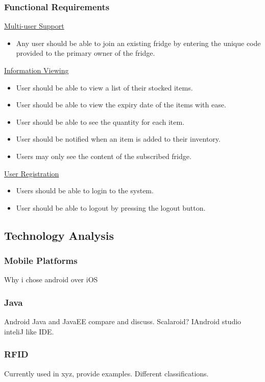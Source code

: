\documentclass[a4paper, 11pt]{article}
\begin{document}
\subsubsection{Functional Requirements}
\underline{Multi-user Support}
\begin{itemize}
  \item Any user should be able to join an existing fridge by entering the unique code provided to the primary owner of the fridge.
\end{itemize}
\underline{Information Viewing}
\begin{itemize}
  \item User should be able to view a list of their stocked items.
  \item User should be able to view the expiry date of the items with ease. 
  \item User should be able to see the quantity for each item.
  \item User should be notified when an item is added to their inventory.
  \item Users may only see the content of the subscribed fridge.
\end{itemize}
\underline{User Registration}
\begin{itemize}
  \item Users should be able to login to the system. 
  \item User should be able to logout by pressing the logout button.
\end{itemize}





\subsection{Technology Analysis}
\subsubsection{Mobile Platforms}
Why i chose android over iOS
\subsubsection{Java}
Android Java and JavaEE compare and discuss. Scalaroid? IAndroid studio inteliJ like IDE.
\subsubsection{RFID}
Currently used in xyz, provide examples. Different classifications. 
\end{document}
